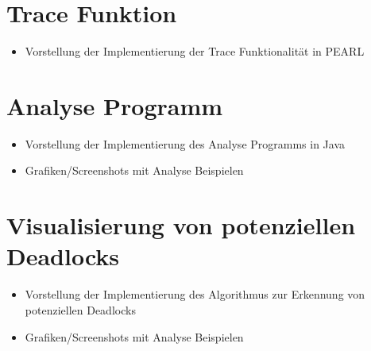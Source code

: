 \section{Trace Funktion}
\label{section:Implementierung:Trace Funktion}
\begin{itemize}
  \item Vorstellung der Implementierung der Trace Funktionalität in PEARL
\end{itemize}

\section{Analyse Programm}
\label{section:Implementierung:Analyse Programm}
\begin{itemize}
  \item Vorstellung der Implementierung des Analyse Programms in Java
  \item Grafiken/Screenshots mit Analyse Beispielen
\end{itemize}

\section{Visualisierung von potenziellen Deadlocks}
\label{section:Implementierung:Visualisierung von potenziellen Deadlocks}
\begin{itemize}
  \item Vorstellung der Implementierung des Algorithmus zur Erkennung von
  potenziellen Deadlocks
  \item Grafiken/Screenshots mit Analyse Beispielen
\end{itemize}